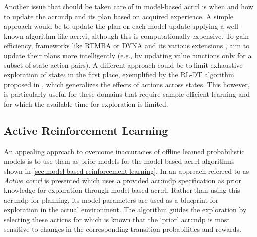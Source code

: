 Another issue that should be taken care of in model-based \acrshort{acr:rl} is when and how to update the \acrshort{acr:mdp} and its plan based on acquired experience. A simple approach would be to update the plan on each model update applying a well-known algorithm like \acrshort{acr:vi}, although this is computationally expensive.
To gain efficiency, frameworks like \textsc{RTMBA} \cite{hester2012rtmba} or \textsc{DYNA} and its various extensions \cite{silver2008sample}, aim to update their plans more intelligently (e.g., by updating value functions only for a subset of state-action pairs).
A different approach could be to limit exhaustive exploration of states in the first place, exemplified by the \textsc{RL-DT} algorithm proposed in \cite{hester2010generalized}, which generalizes the effects of actions across states.
This however, is particularly useful for these domains that require sample-efficient learning and for which the available time for exploration is limited.

\subsection{Active Reinforcement Learning}
\label{sec:active-reinforcement-learning}

An appealing approach to overcome inaccuracies of offline learned probabilistic models is to use them as prior models for the model-based \acrshort{acr:rl} algorithms shown in \autoref{sec:model-based-reinforcement-learning}.
In \cite{epshteyn2008active} an approach referred to as \textit{Active \acrlong{acr:rl}} is presented which uses a provided \acrshort{acr:mdp} specification as prior knowledge for exploration through model-based \acrshort{acr:rl}.
Rather than using this \acrshort{acr:mdp} for planning, its model parameters are used as a blueprint for exploration in the actual environment.
The algorithm guides the exploration by selecting these actions for which is known that the `prior' \acrshort{acr:mdp} is most sensitive to changes in the corresponding transition probabilities and rewards.



